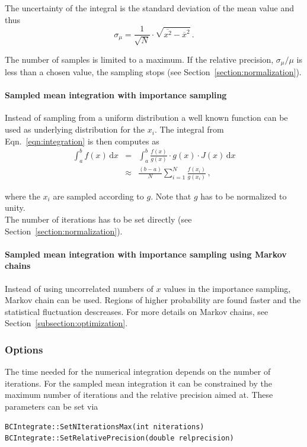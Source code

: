 \documentclass[11pt, a4paper]{article}
\begin{document}
\noindent 
The uncertainty of the integral is the standard deviation of the mean
value and thus 
%
\begin{equation}
\sigma_{\mu} = \frac{1}{\sqrt{N}} \cdot \sqrt{\overline{x^{2}} - \overline{x}^{2}} \, . 
\end{equation} 

\noindent 
The number of samples is limited to a maximum. If the relative
precision, $\sigma_{\mu}/\mu$ is less than a chosen value, the
sampling stops (see Section~\ref{section:normalization}). 

\paragraph{Sampled mean integration with importance sampling} 

Instead of sampling from a uniform distribution a well known function
can be used as underlying distribution for the $x_{i}$. The integral
from Eqn.~\ref{eqn:integration} is then computes as 
%
\begin{eqnarray}
\int_{a}^{b} f(x) \, \mathrm{d}x & = & \int_{a}^{b} \frac{f(x)}{g(x)} \cdot g(x) \cdot J(x) \, \mathrm{d}x \\ 
 & \approx & \frac{(b - a)}{N} \sum_{i=1}^{N} \frac{f(x_{i})}{g(x_{i})} \, , 
\end{eqnarray} 

\noindent 
where the $x_{i}$ are sampled according to $g$. Note that $g$ has to
be normalized to unity. \\ 

\noindent 
The number of iterations has to be set directly (see Section~\ref{section:normalization}). 

\paragraph{Sampled mean integration with importance sampling using Markov chains} 

Instead of using uncorrelated numbers of $x$ values in the importance
sampling, Markov chain can be used. Regions of higher probability are
found faster and the statistical fluctuation descreases. For more
details on Markov chains, see Section~\ref{subsection:optimization}.

\subsubsection{Options}

The time needed for the numerical integration depends on the number of
iterations. For the sampled mean integration it can be constrained by
the maximum number of iterations and the relative precision aimed
at. These parameters can be set via
%
\begin{verbatim}
BCIntegrate::SetNIterationsMax(int niterations)
BCIntegrate::SetRelativePrecision(double relprecision) 
\end{verbatim} 
\end{document}
